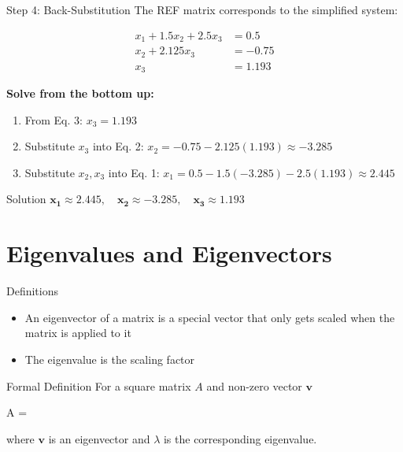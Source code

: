 \documentclass[aspectratio=169,xcolor=dvipsnames,svgnames,x11names,fleqn]{beamer}
\begin{document}
\begin{frame}{Step 4: Back-Substitution}
\centering
The REF matrix corresponds to the simplified system:

\vspace{3mm}
\begin{align*}
x_1 + 1.5x_2 + 2.5x_3 &= 0.5 \\
x_2 + 2.125x_3 &= -0.75 \\
x_3 &= 1.193
\end{align*}

\vspace{5mm}
\textbf{Solve from the bottom up:}
\begin{enumerate}
    \item From Eq. 3: \alert{$x_3 = 1.193$}
    \item Substitute $x_3$ into Eq. 2: $x_2 = -0.75 - 2.125(1.193) \approx -3.285$
    \item Substitute $x_2, x_3$ into Eq. 1: $x_1 = 0.5 - 1.5(-3.285) - 2.5(1.193) \approx 2.445$
\end{enumerate}

\vspace{3mm}
\begin{block}{Solution}
$\mathbf{x_1 \approx 2.445, \quad x_2 \approx -3.285, \quad x_3 \approx 1.193}$
\end{block}
\end{frame}

\section{Eigenvalues and Eigenvectors}

\begin{frame}
    \sectionpage
\end{frame}

\begin{frame}{Definitions}
\begin{tblock}{}
\begin{itemize}
\item An \alert{eigenvector} of a matrix is a special vector that only gets scaled when the matrix is applied to it
\item The \alert{eigenvalue} is the scaling factor
\end{itemize}
\end{tblock}
\vspace{5mm}
\begin{tblock}{Formal Definition}
For a square matrix $A$ and non-zero vector $\mathbf{v}$
\begin{multiequation}
A = \lambda{}
\end{multiequation}
where $\mathbf{v}$ is an eigenvector and $\lambda$  is the corresponding eigenvalue.
\end{tblock}

\end{frame}
\end{document}
